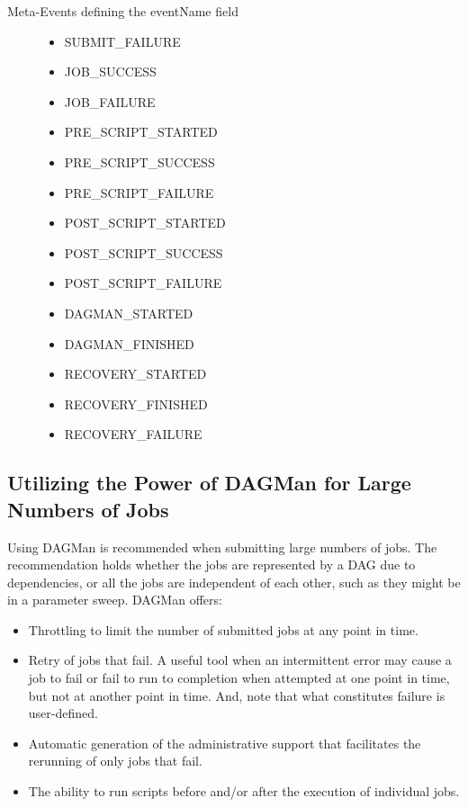 \begin{description}
\item[Meta-Events defining the eventName field]
\begin{itemize}
\item SUBMIT\_FAILURE
\item JOB\_SUCCESS
\item JOB\_FAILURE
\item PRE\_SCRIPT\_STARTED
\item PRE\_SCRIPT\_SUCCESS
\item PRE\_SCRIPT\_FAILURE
\item POST\_SCRIPT\_STARTED
\item POST\_SCRIPT\_SUCCESS
\item POST\_SCRIPT\_FAILURE
\item DAGMAN\_STARTED
\item DAGMAN\_FINISHED
\item RECOVERY\_STARTED
\item RECOVERY\_FINISHED
\item RECOVERY\_FAILURE
\end{itemize}
\end{description}


\subsection{\label{sec:DAGLotsaJobs}Utilizing the Power of DAGMan for Large Numbers of Jobs}

Using DAGMan is recommended when submitting large numbers of jobs.
The recommendation holds whether the jobs are represented by
a DAG due to dependencies, or all the jobs are
independent of each other, such as they might be in a parameter sweep.
DAGMan offers:
\begin{itemize}
\item{Throttling}
  to limit the number of submitted jobs at any point in time.
\item{Retry of jobs that fail.}
  A useful tool when an intermittent error may cause a job to fail
  or fail to run to completion when attempted at one point in time,
  but not at another point in time.
  And, note that what constitutes failure is user-defined.
\item{Automatic generation of the administrative support that facilitates the
  rerunning of only jobs that fail.}
\item{The ability to run scripts before and/or after the execution of
individual jobs.}
\end{itemize}

